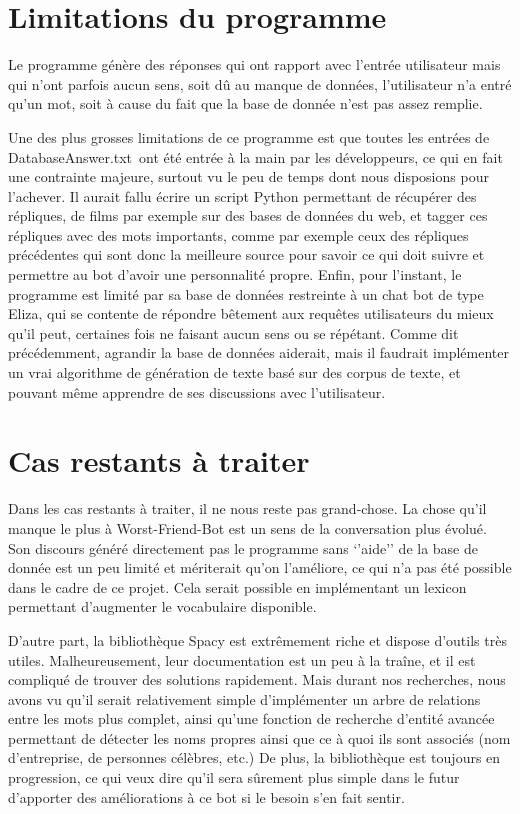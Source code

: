 \documentclass[paper=a4, fontsize=12pt]{article}
\begin{document}
\section{Limitations du programme}
Le programme génère des réponses qui ont rapport avec l’entrée utilisateur mais qui n’ont parfois aucun sens, soit dû au manque de données, l’utilisateur n’a entré qu’un mot, soit à cause du fait que la base de donnée n’est pas assez remplie.

	Une des plus grosses limitations de ce programme est que toutes les entrées de DatabaseAnswer.txt ont été entrée à la main par les développeurs, ce qui en fait une contrainte majeure, surtout vu le peu de temps dont nous disposions pour l’achever. Il aurait fallu écrire un script Python permettant de récupérer des répliques, de films par exemple sur des bases de données du web, et tagger ces répliques avec des mots importants, comme par exemple ceux des répliques précédentes qui sont donc la meilleure source pour savoir ce qui doit suivre et permettre au bot d’avoir une personnalité propre.
Enfin, pour l’instant, le programme est limité par sa base de données restreinte à un chat bot de type Eliza, qui se contente de répondre bêtement aux requêtes utilisateurs du mieux qu’il peut, certaines fois ne faisant aucun sens ou se répétant. Comme dit précédemment, agrandir la base de données aiderait, mais il faudrait implémenter un vrai algorithme de génération de texte basé sur des corpus de texte, et pouvant même apprendre de ses discussions avec l’utilisateur. 

\section{Cas restants à traiter}
Dans les cas restants à traiter, il ne nous reste pas grand-chose. La chose qu’il manque le plus à Worst-Friend-Bot est un sens de la conversation plus évolué. Son discours généré directement pas le programme sans ‘’aide’’ de la base de donnée est un peu limité et mériterait qu’on l’améliore, ce qui n’a pas été possible dans le cadre de ce projet. Cela serait possible en implémentant un lexicon permettant d’augmenter le vocabulaire disponible.

D’autre part, la bibliothèque Spacy est extrêmement riche et dispose d’outils très utiles. Malheureusement, leur documentation est un peu à la traîne, et il est compliqué de trouver des solutions rapidement. Mais durant nos recherches, nous avons vu qu’il serait relativement simple d’implémenter un arbre de relations entre les mots plus complet, ainsi qu’une fonction de recherche d’entité avancée permettant de détecter les noms propres ainsi que ce à quoi ils sont associés (nom d’entreprise, de personnes célèbres, etc.) De plus, la bibliothèque est toujours en progression, ce qui veux dire qu’il sera sûrement plus simple dans le futur d’apporter des améliorations à ce bot si le besoin s’en fait sentir.
\end{document}
